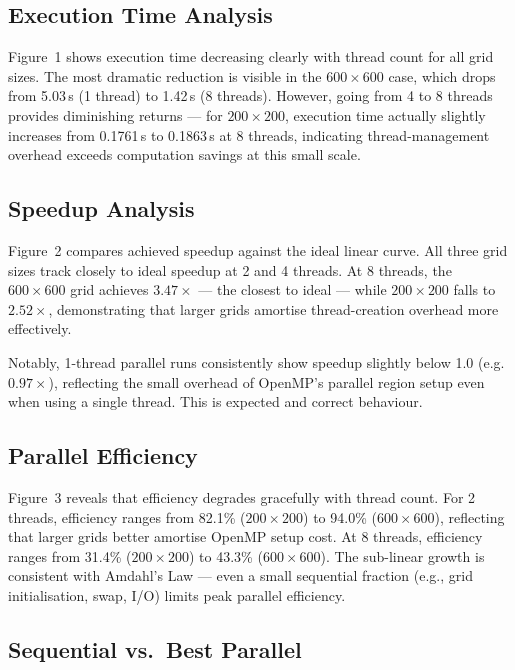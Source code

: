 \documentclass[12pt,a4paper]{article}
\begin{document}
\subsection{Execution Time Analysis}

Figure~1 shows execution time decreasing clearly with thread count for all grid
sizes. The most dramatic reduction is visible in the $600\times600$ case, which
drops from 5.03\,s (1 thread) to 1.42\,s (8 threads). However, going from 4 to 8
threads provides diminishing returns --- for $200\times200$, execution time actually
slightly increases from 0.1761\,s to 0.1863\,s at 8 threads, indicating
thread-management overhead exceeds computation savings at this small scale.

\subsection{Speedup Analysis}

Figure~2 compares achieved speedup against the ideal linear curve. All three grid
sizes track closely to ideal speedup at 2 and 4 threads. At 8 threads, the
$600\times600$ grid achieves $3.47\times$ --- the closest to ideal --- while
$200\times200$ falls to $2.52\times$, demonstrating that larger grids amortise
thread-creation overhead more effectively.

Notably, 1-thread parallel runs consistently show speedup slightly below 1.0
(e.g.\ $0.97\times$), reflecting the small overhead of OpenMP's parallel region
setup even when using a single thread. This is expected and correct behaviour.

\subsection{Parallel Efficiency}

Figure~3 reveals that efficiency degrades gracefully with thread count. For 2
threads, efficiency ranges from 82.1\% ($200\times200$) to 94.0\% ($600\times600$),
reflecting that larger grids better amortise OpenMP setup cost. At 8 threads,
efficiency ranges from 31.4\% ($200\times200$) to 43.3\% ($600\times600$). The
sub-linear growth is consistent with Amdahl's Law --- even a small sequential
fraction (e.g., grid initialisation, swap, I/O) limits peak parallel efficiency.

\subsection{Sequential vs.\ Best Parallel}
\end{document}
